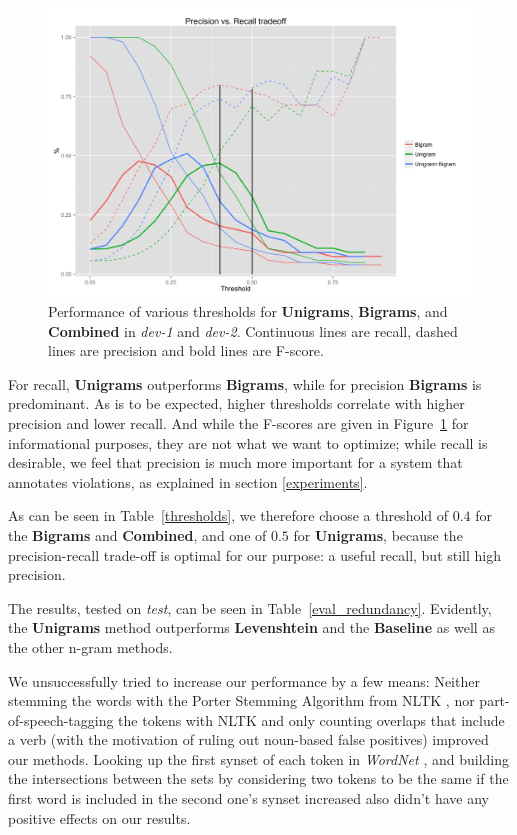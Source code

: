 \documentclass[a4paper,10pt]{scrartcl}
\theoremstyle{style}
\begin{document}
\begin{figure}
\begin{center}
\includegraphics[scale=0.15]{a.png}
\end{center}
\caption{Performance of various thresholds for \textbf{Unigrams}, \textbf{Bigrams}, and \textbf{Combined} in \textit{dev-1} and \textit{dev-2}. Continuous lines are recall, dashed lines are precision and bold lines are F-score.}
\label{redundancy_graph}
\end{figure}

For recall, \textbf{Unigrams} outperforms \textbf{Bigrams}, while for precision \textbf{Bigrams} is predominant.
As is to be expected, higher thresholds correlate with higher precision and lower recall. And while the F-scores are given in Figure~\ref{redundancy_graph} for informational purposes, they are not what we want to optimize; while recall is desirable, we feel that precision is much more important for a system that annotates violations, as explained in section \ref{experiments}.

As can be seen in Table~\ref{thresholds}, we therefore choose a threshold of $0.4$ for the \textbf{Bigrams} and \textbf{Combined}, and one of $0.5$ for \textbf{Unigrams}, because the precision-recall trade-off is optimal for our purpose: a useful recall, but still high precision.

The results, tested on \textit{test}, can be seen in Table~\ref{eval_redundancy}. Evidently, the \textbf{Unigrams} method outperforms \textbf{Levenshtein} and the \textbf{Baseline} as well as the other n-gram methods.

We unsuccessfully tried to increase our performance by a few means: Neither stemming the words with the Porter Stemming Algorithm \citep{porter1980algorithm} from NLTK \citep{bird2009natural}, nor part-of-speech-tagging the tokens with NLTK and only counting overlaps that include a verb (with the motivation of ruling out noun-based false positives) improved our methods. Looking up the first synset of each token in \textit{WordNet} \citep{fellbaum2005wordnet}, and building the intersections between the sets by considering two tokens to be the same if the first word is included in the second one's synset increased also didn't have any positive effects on our results.
\end{document}
